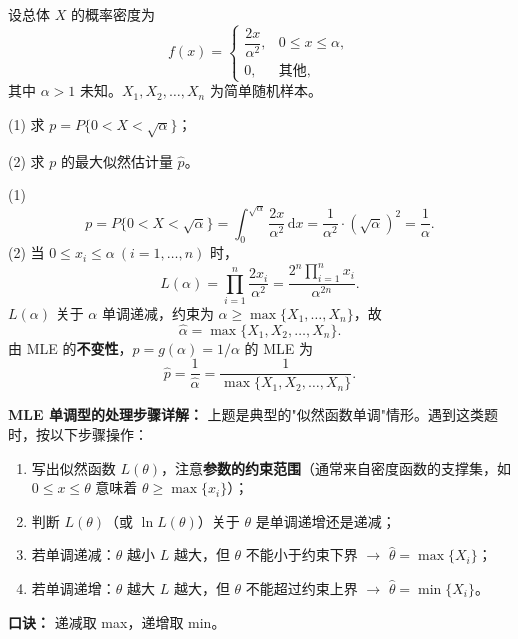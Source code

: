 ﻿\documentclass[lang=cn,11pt]{elegantbook}
\begin{document}
\begin{exercise}[最大似然估计的不变性] \label{ex:mle_04}
设总体 \(X\) 的概率密度为
\[
f(x)=
\begin{cases}
\dfrac{2x}{\alpha^2}, & 0\leq x\leq\alpha,\\
0, & \text{其他},
\end{cases}
\]
其中 \(\alpha>1\) 未知。\(X_1,X_2,\dots,X_n\) 为简单随机样本。\par
(1) 求 \(p=P\{0<X<\sqrt{\alpha}\}\)；\par
(2) 求 \(p\) 的最大似然估计量 \(\hat{p}\)。
\end{exercise}
\begin{solution}
(1)
\[
p=P\{0<X<\sqrt{\alpha}\}=\int_0^{\sqrt{\alpha}}\frac{2x}{\alpha^2}\,\mathrm{d}x=\frac{1}{\alpha^2}\cdot(\sqrt{\alpha})^2=\frac{1}{\alpha}.
\]
(2) 当 \(0\leq x_i\leq\alpha\ (i=1,\dots,n)\) 时，
\[
L(\alpha)=\prod_{i=1}^{n}\frac{2x_i}{\alpha^2}=\frac{2^n\prod_{i=1}^{n}x_i}{\alpha^{2n}}.
\]
\(L(\alpha)\) 关于 \(\alpha\) 单调递减，约束为 \(\alpha\geq\max\{X_1,\dots,X_n\}\)，故
\[
\hat{\alpha}=\max\{X_1,X_2,\dots,X_n\}.
\]
由 MLE 的\textbf{不变性}，\(p=g(\alpha)=1/\alpha\) 的 MLE 为
\[
\hat{p}=\frac{1}{\hat{\alpha}}=\frac{1}{\max\{X_1,X_2,\dots,X_n\}}.
\]
\end{solution}

\begin{note}
\textbf{MLE 单调型的处理步骤详解：} 上题是典型的"似然函数单调"情形。遇到这类题时，按以下步骤操作：
\begin{enumerate}
    \item 写出似然函数 $L(\theta)$，注意\textbf{参数的约束范围}（通常来自密度函数的支撑集，如 $0\leqslant x\leqslant\theta$ 意味着 $\theta\geqslant\max\{x_i\}$）；
    \item 判断 $L(\theta)$（或 $\ln L(\theta)$）关于 $\theta$ 是单调递增还是递减；
    \item 若单调递减：$\theta$ 越小 $L$ 越大，但 $\theta$ 不能小于约束下界 $\to$ $\hat\theta = \max\{X_i\}$；
    \item 若单调递增：$\theta$ 越大 $L$ 越大，但 $\theta$ 不能超过约束上界 $\to$ $\hat\theta = \min\{X_i\}$。
\end{enumerate}
\textbf{口诀：} 递减取 max，递增取 min。
\end{note}
\end{document}
